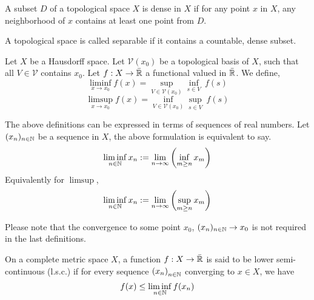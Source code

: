 \begin{definition}
	A subset $D$ of a topological space $X$ is dense in $X$ if for any point $x$ in $X$, any neighborhood of $x$ contains at least one point from $D$.
\end{definition}

\begin{definition}
	A topological space is called separable if it contains a countable, dense subset.
\end{definition}

\begin{definition}
	Let $X$ be a Hausdorff space. Let $\mathcal{V}(x_0)$ be a topological basis of $X$, such that all $V\in \mathcal{V}$ contains $x_0$. Let $f: X\rightarrow \bar{\mathbb{R}}$ a functional valued in $\bar{\mathbb{R}}$. We define, 
	\begin{equation*}
	\liminf_{x\rightarrow x_0} f(x)= \sup_{V\in \mathcal{V}(x_0)} \inf_{s\in V}\ f(s)
	\end{equation*}
	\begin{equation*}
	\limsup_{x\rightarrow x_0} f(x)= \inf_{V\in \mathcal{V}(x_0)} \sup_{s\in V}\ f(s)
	\end{equation*}
	
The above definitions can be expressed in terms of sequences of real numbers. Let $(x_n)_{n \in \mathbb{N}}$ be a sequence in $X$, the above formulation is equivalent to say.
\begin{equation*}
	\liminf_{n\in \mathbb{N}} x_n := \lim_{n\rightarrow \infty} \left( \inf_{m\geq n} x_m \right)
\end{equation*}
Equivalently for $\limsup$,
	\begin{equation*}
	\liminf_{n\in \mathbb{N}} x_n := \lim_{n\rightarrow \infty} \left( \sup_{m\geq n} x_m \right)
	\end{equation*}

Please note that the convergence to some point $x_0$, $(x_n)_{n\in \mathbb{N}}\rightarrow x_0$ is not required in the last definitions.
\end{definition}

\begin{definition}
	On a complete metric space $X$, a function $f: X\rightarrow\bar{\mathbb{R}}$ is said to be lower semi-continuous (l.s.c.) if for every sequence $\left( x_n \right)_{n\in\mathbb{N}}$ converging to $x\in X$, we have \begin{equation*}
		f(x)\leq \liminf_{n\in \mathbb{N}} f(x_n)
	\end{equation*}
\end{definition}

